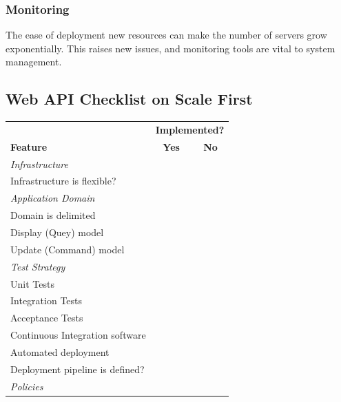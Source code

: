 \documentclass[10pt,article]{IEEEtran}
\begin{document}
\subsubsection{Monitoring}
The ease of deployment new resources can make the number of servers grow exponentially. This raises new issues, and monitoring tools are vital to system management.


\subsection{Web API Checklist on Scale First}

\newcommand{\ra}[1]{\renewcommand{\arraystretch}{#1}}
\begin{table}[h!]
    \ra{1.0}
    \centering
    \begin{tabular}{lc|c} 
        \toprule[1.5pt]
        & \multicolumn{2}{c}{\textbf{Implemented?}} \\
        \textbf{Feature} & \textbf{Yes} & \textbf{No} \\ \hline
        \emph{Infrastructure} & & \\
        \hspace{0.2cm}Infrastructure is flexible?  & & \\
        \emph{Application Domain} & & \\
        \hspace{0.2cm}Domain is delimited &  & \\
        \hspace{0.2cm}Display (Quey) model &  & \\
        \hspace{0.2cm}Update (Command) model & & \\
        \emph{Test Strategy} & & \\
        \hspace{0.2cm}Unit Tests & & \\
        \hspace{0.2cm}Integration Tests & & \\
        \hspace{0.2cm}Acceptance Tests & & \\
        \hspace{0.2cm}Continuous Integration software & &\\
        Automated deployment & & \\
        \hspace{0.2cm}Deployment pipeline is defined? & &\\ 
        \emph{Policies} & & \\

\end{tabular}
\end{table}
\end{document}
